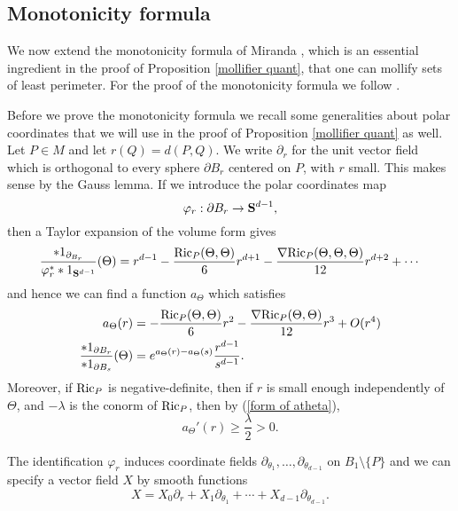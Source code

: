 
\subsection{Monotonicity formula}\label{inequalities}
We now extend the monotonicity formula of Miranda \cite[Teorema 3.3]{Miranda66}, which is an essential ingredient in the proof of Proposition \ref{mollifier quant}, that one can mollify sets of least perimeter.
For the proof of the monotonicity formula we follow \cite[Chapter 5]{Giusti77}.

Before we prove the monotonicity formula we recall some generalities about polar coordinates that we will use in the proof of Proposition \ref{mollifier quant} as well.
Let $P \in M$ and let $r(Q) = d(P, Q)$.
We write $\partial_r$ for the unit vector field which is orthogonal to every sphere $\partial B_r$ centered on $P$, with $r$ small.
This makes sense by the Gauss lemma.
If we introduce the polar coordinates map
$$\varphi_r: \partial B_r \to \mathbf S^{d - 1},$$
then a Taylor expansion of the volume form \cite[Lemma 3.4]{schoen1994lectures} gives
\begin{equation}\label{spheres in polar coordinates}
\frac{*1_{\partial_{B_r}}}{\varphi_r^* *1_{\mathbf S^{d - 1}}}(\Theta) = r^{d - 1} - \frac{\mathrm{Ric}_P(\Theta, \Theta)}{6}r^{d + 1} - \frac{\nabla \mathrm{Ric}_P(\Theta, \Theta, \Theta)}{12}r^{d + 2} + \cdots
\end{equation}
and hence we can find a function $a_\Theta$ which satisfies
\begin{align}
\label{form of atheta}
a_\Theta(r) &= -\frac{\mathrm{Ric}_P(\Theta, \Theta)}{6}r^2 - \frac{\nabla \mathrm{Ric}_P(\Theta, \Theta)}{12}r^3 + O(r^4) \\
\label{rescale the sphere form}
\frac{*1_{\partial B_r}}{*1_{\partial B_s}}(\Theta) &= e^{a_\Theta(r) - a_\Theta(s)} \frac{r^{d - 1}}{s^{d - 1}}.
\end{align}
Moreover, if $\mathrm{Ric}_P$ is negative-definite, then if $r$ is small enough independently of $\Theta$, and $-\lambda$ is the conorm of $\mathrm{Ric}_P$, then by (\ref{form of atheta}),
\begin{equation}\label{a is nondecreasing}
a_\Theta'(r) \geq \frac{\lambda}{2} > 0.
\end{equation}

The identification $\varphi_r$ induces coordinate fields $\partial_{\theta_1}, \dots, \partial_{\theta_{d - 1}}$ on $B_1 \setminus \{P\}$ and we can specify a vector field $X$ by smooth functions
$$X = X_0 \partial_r + X_1 \partial_{\theta_1} + \cdots + X_{d - 1} \partial_{\theta_{d - 1}}.$$

